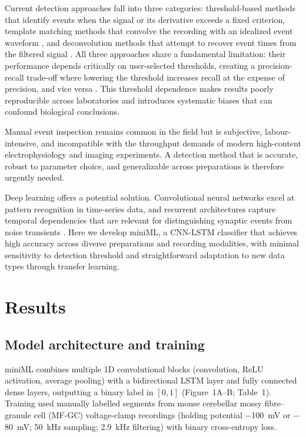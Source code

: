 \documentclass[11pt]{article}
\begin{document}
Current detection approaches fall into three categories: threshold-based methods that identify events when the signal or its derivative exceeds a fixed criterion, template matching methods that convolve the recording with an idealized event waveform \citep{clements1997detection}, and deconvolution methods that attempt to recover event times from the filtered signal \citep{pernia2012deconvolution}. All three approaches share a fundamental limitation: their performance depends critically on user-selected thresholds, creating a precision-recall trade-off where lowering the threshold increases recall at the expense of precision, and vice versa \citep{bhatt2020types}. This threshold dependence makes results poorly reproducible across laboratories and introduces systematic biases that can confound biological conclusions.

Manual event inspection remains common in the field but is subjective, labour-intensive, and incompatible with the throughput demands of modern high-content electrophysiology and imaging experiments. A detection method that is accurate, robust to parameter choice, and generalizable across preparations is therefore urgently needed.

Deep learning offers a potential solution. Convolutional neural networks excel at pattern recognition in time-series data, and recurrent architectures capture temporal dependencies that are relevant for distinguishing synaptic events from noise transients \citep{lecun2015deep}. Here we develop miniML, a CNN-LSTM classifier that achieves high accuracy across diverse preparations and recording modalities, with minimal sensitivity to detection threshold and straightforward adaptation to new data types through transfer learning.

\section{Results}

\subsection{Model architecture and training}

miniML combines multiple 1D convolutional blocks (convolution, ReLU activation, average pooling) with a bidirectional LSTM layer and fully connected dense layers, outputting a binary label in $[0, 1]$ (Figure~1A--B; Table~1). Training used manually labelled segments from mouse cerebellar mossy fibre--granule cell (MF-GC) voltage-clamp recordings (holding potential $-$100~mV or $-$80~mV; 50~kHz sampling; 2.9~kHz filtering) with binary cross-entropy loss.
\end{document}
